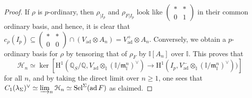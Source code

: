 \documentclass[12pt]{amsart}
\newcommand\bI{\mathbb{I}}
\newcommand\bQ{\mathbb{Q}}
\newcommand\cH{\mathcal{H}}
\newcommand\gm{\mathfrak{m}}
\DeclareMathOperator{\ad}{ad}
\DeclareMathOperator{\Sel}{Sel}
\newcommand{\HH}{\mathrm{H}}
\theoremstyle{defstyle}
\theoremstyle{thmstyle}
\begin{document}
\begin{proof}
If $\rho$ is $p$-ordinary, then $\rho_{|I_p}$ and $\rho_{F|I_p}$ look like $\left(\begin{smallmatrix}* & * \\ 0 & 1\end{smallmatrix}\right)$ in their common ordinary basis, and hence, it is clear that $c_\rho(I_p)\subseteq \left(\begin{smallmatrix}* & * \\ 0 & 0\end{smallmatrix}\right)\cap (V_{\ad}\otimes A_n)=V^+_{\ad}\otimes A_n$. Conversely, we obtain a $p$-ordinary basis for $\rho$ by tensoring that of $\rho_F$ by $\bI[A_n]$ over $\bI$. This proves that 
\[\cH_n\simeq \ker\left[\HH^1(\bQ_S/\bQ,V_{\ad}\otimes_{\bI} (\bI/\gm_\bI^n)^\vee) \to \HH^1(I_p,V_{\ad}^-\otimes_{\bI}(\bI/\gm_\bI^n)^\vee))\right] \]
for all $n$, and by taking the direct limit over $n\geq 1$, one sees that $C_1(\lambda_\Sigma)^\vee\simeq\varinjlim_n\cH_n\simeq\Sel^\Sigma(\ad F)$ as claimed.
\end{proof}
\end{document}
